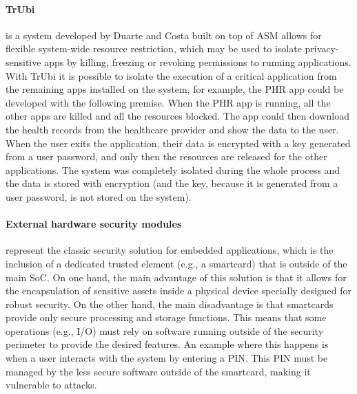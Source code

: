 \paragraph{\textbf{TrUbi}} is a system developed by Duarte \cite{nunoduarte} and Costa \cite{miguelcosta} built on top of ASM \cite{heuser2014asm} allows for flexible system-wide resource restriction, which may be used to isolate privacy-sensitive apps by killing, freezing or revoking permissions to running applications. With TrUbi it is possible to isolate the execution of a critical application from the remaining apps installed on the system, for example, the \ac{PHR} app could be developed with the following premise.
When the \ac{PHR} app is running, all the other apps are killed and all the resources blocked. The app could then download the health records from the healthcare provider and show the data to the user. When the user exits the application, their data is encrypted with a key generated from a user password, and only then the resources are released for the other applications. The system was completely isolated during the whole process and the data is stored with encryption (and the key, because it is generated from a user password, is not stored on the system).


\paragraph{\textbf{External hardware security modules}} represent the classic security solution for embedded applications, which is the inclusion of a dedicated trusted element (e.g., a smartcard) that is outside of the main \ac{SoC}. On one hand, the main advantage of this solution is that it allows for the encapsulation of sensitive assets inside a physical device specially designed for robust security. On the other hand, the main disadvantage is that smartcards provide only secure processing and storage functions. This means that some operations (e.g., I/O) must rely on software running outside of the security perimeter to provide the desired features. An example where this happens is when a user interacts with the system by entering a \ac{PIN}. This \ac{PIN} must be managed by the less secure software outside of the smartcard, making it vulnerable to attacks.

